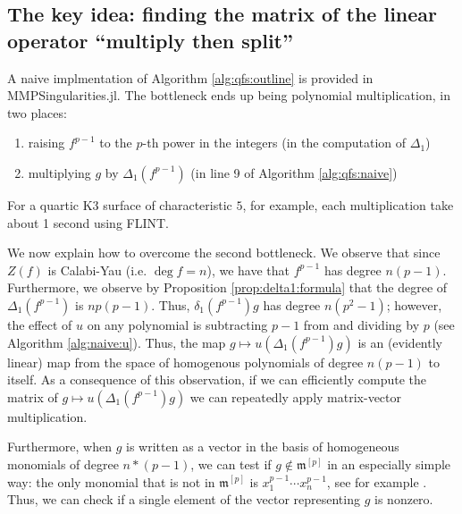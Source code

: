 \subsection{The key idea: finding the matrix of the linear operator ``multiply then split''}

A naive implmentation of Algorithm \ref{alg:qfs:outline}
is provided in MMPSingularities.jl.
The bottleneck ends up being polynomial multiplication, 
in two places:
\begin{enumerate}[(1)]
    \item raising \(f^{p-1}\) to the \(p\)-th power in the integers
        (in the computation of \(\Delta_{1}\))
    \item multiplying \(g\) by \(\Delta_{1}(f^{p-1})\) 
        (in line 9 of Algorithm \ref{alg:qfs:naive})
\end{enumerate}

For a quartic K3 surface of characteristic \(5\),
for example, each multiplication take about 1 second 
using FLINT. 

%

We now explain how to overcome the second
bottleneck. We observe that 
since \(Z(f)\) is Calabi-Yau
(i.e. \(\deg f = n\)), we have that \(f^{p-1}\) has degree
\(n(p-1)\). 
Furthermore, we observe by Proposition \ref{prop:delta1:formula}
that the degree of \(\Delta_{1}(f^{p-1})\) 
is \(np(p - 1)\).
Thus, \(\delta_{1}(f^{p-1})g\) has degree
\(n(p^{2} - 1)\); however, the effect 
of \(u\) on any polynomial is subtracting \(p-1\)
from and dividing by \(p\) 
(see Algorithm \ref{alg:naive:u}).
Thus, the map 
\(g \mapsto u(\Delta_{1}(f^{p-1}) g)\) 
is an (evidently linear) map from 
the space of homogenous polynomials of degree \(n(p-1)\) 
to itself.
As a consequence of this observation,
if we can efficiently compute the matrix of 
\(g \mapsto u(\Delta_{1}(f^{p-1})g)\)
we can repeatedly apply matrix-vector multiplication.

Furthermore, when \(g\) is written as a vector 
in the basis of homogeneous monomials of degree
\(n*(p-1)\), we can test if \(g \notin \mathfrak{m}^{[p]}\) 
in an especially simple way: the only 
monomial that is not in \(\mathfrak{m}^{[p]}\) is
\(x_{1}^{p-1}\cdots x_{n}^{p-1}\), 
see for example \cite{kty-2022-fedder}.
Thus, we can check if a single element of the vector representing
\(g\) is nonzero.

